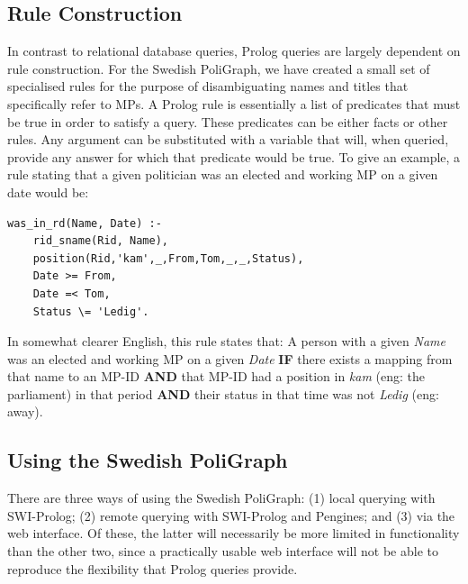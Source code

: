\subsection{Rule Construction}

In contrast to relational database queries, Prolog queries are largely dependent on rule construction. For the Swedish PoliGraph, we have created a small set of specialised rules for the purpose of disambiguating names and titles that specifically refer to MPs. A Prolog rule is essentially a list of predicates that must be true in order to satisfy a query. These predicates can be either facts or other rules. Any argument can be substituted with a variable that will, when queried, provide any answer for which that predicate would be true. To give an example, a rule stating that a given politician was an elected and working MP on a given date would be:

\begin{lstlisting}
was_in_rd(Name, Date) :-
    rid_sname(Rid, Name),
    position(Rid,'kam',_,From,Tom,_,_,Status),
    Date >= From,
    Date =< Tom,
    Status \= 'Ledig'.
\end{lstlisting}
%
In somewhat clearer English, this rule states that: A person with a given \emph{Name} was an elected and working MP on a given \emph{Date} \textbf{IF} there exists a mapping from that name to an MP-ID \textbf{AND} that MP-ID had a position in \emph{kam} (eng: the parliament) in that period \textbf{AND} their status in that time was not \emph{Ledig} (eng: away).

\subsection{Using the Swedish PoliGraph}

There are three ways of using the Swedish PoliGraph: (1) local querying with SWI-Prolog; (2) remote querying with SWI-Prolog and Pengines; and (3) via the web interface. Of these, the latter will necessarily be more limited in functionality than the other two, since a practically usable web interface will not be able to reproduce the flexibility that Prolog queries provide.

